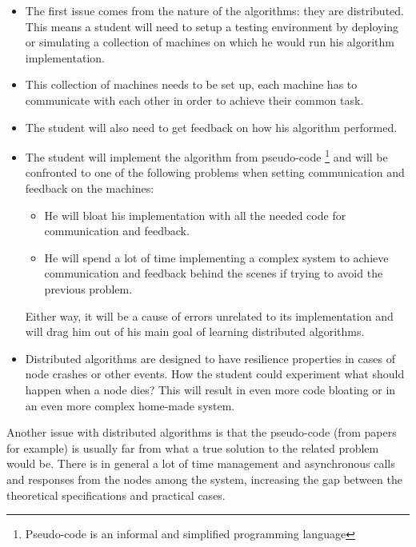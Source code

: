 \documentclass{eplmastersthesis}
\begin{document}
      \begin{itemize}
        \item The first issue comes from the nature of the algorithms: they are
        distributed. This means a student will need to setup a testing
        environment by deploying or simulating a collection of machines on
        which he would run his algorithm implementation.
        \item This collection of machines needs to be set up, each machine has
        to communicate with each other in order to achieve their common task.
        \item The student will also need to get feedback on how his
        algorithm performed.
        \item The student will implement the algorithm from pseudo-code
        \footnote{Pseudo-code is an informal and simplified programming language}
        and will be confronted to one of the following problems when setting
        communication and feedback on the machines:
          \begin{itemize}
            \item He will bloat his implementation with all the needed
            code for communication and feedback.
            \item He will spend a lot of time implementing a complex
            system to achieve communication and feedback behind the scenes if
            trying to avoid the previous problem.
          \end{itemize}
        Either way, it will be a cause of errors unrelated to its
        implementation and will drag him out of his main goal of learning
        distributed algorithms.
        \item Distributed algorithms are designed to have resilience
        properties in cases of node crashes or other events. How the student
        could experiment what should happen when a node dies? This will result
        in even more code bloating or in an even more complex home-made system.
      \end{itemize}

      Another issue with distributed algorithms is that the pseudo-code
      (from papers for example) is usually far from what a true solution to the
      related problem would be. There is in general a lot of time management
      and asynchronous calls and responses from the nodes among the system,
      increasing the gap between the theoretical specifications and practical
      cases.
\end{document}
